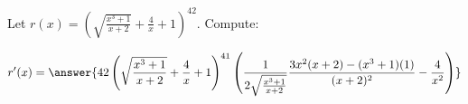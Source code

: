 \documentclass{ximera}
\author{Bobby Ramsey}
\begin{document}
\begin{exercise}
	Let $r(x) = \left(  \sqrt{\frac{x^3+1}{x+2}} + \frac{4}{x} + 1\right)^{42}$. Compute:

	\[ r'(x) =\answer{  42\left( \sqrt{\frac{x^3+1}{x+2}} + \frac{4}{x} + 1\right)^{41} \left( \frac{1}{2\sqrt{\frac{x^3+1}{x+2}}}\frac{3x^2(x+2)-(x^3+1)(1)}{(x+2)^2} - \frac{4}{x^2}\right)  } \]

\end{exercise}
\end{document}
